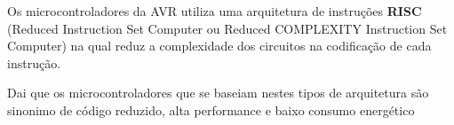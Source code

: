 \documentclass[titlepage, a4paper, 10pt, reqno, openany]{report}
\begin{document}
Os microcontroladores da AVR utiliza uma arquitetura de instru\c{c}\~{o}es {\bf RISC} (Reduced Instruction Set Computer ou Reduced COMPLEXITY Instruction Set Computer) na qual reduz a complexidade dos circuitos na codifica\c{c}\~{a}o de cada instru\c{c}\~{a}o. \par
Dai que os microcontroladores que se baseiam nestes tipos de arquitetura s\~{a}o sinonimo de c\'{o}digo reduzido, alta performance e baixo consumo energ\'{e}tico \par

\end{document}
